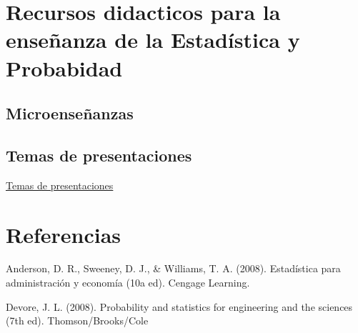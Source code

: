 \documentclass[
]{book}
\begin{document}
\hypertarget{recursos-didacticos-para-la-enseuxf1anza-de-la-estaduxedstica-y-probabidad}{%
\chapter{Recursos didacticos para la enseñanza de la Estadística y Probabidad}\label{recursos-didacticos-para-la-enseuxf1anza-de-la-estaduxedstica-y-probabidad}}

\hypertarget{microenseuxf1anzas}{%
\section{Microenseñanzas}\label{microenseuxf1anzas}}

\hypertarget{temas-de-presentaciones}{%
\section{Temas de presentaciones}\label{temas-de-presentaciones}}

\href{https://correouss-my.sharepoint.com/:f:/r/personal/imaldonadoc1_docente_uss_cl/Documents/doc/temas?csf=1\&web=1}{Temas de presentaciones}

\hypertarget{referencias}{%
\chapter*{Referencias}\label{referencias}}

Anderson, D. R., Sweeney, D. J., \& Williams, T. A. (2008). Estadística para administración y economía (10a ed). Cengage Learning.

Devore, J. L. (2008). Probability and statistics for engineering and the sciences (7th ed). Thomson/Brooks/Cole

  
\end{document}
